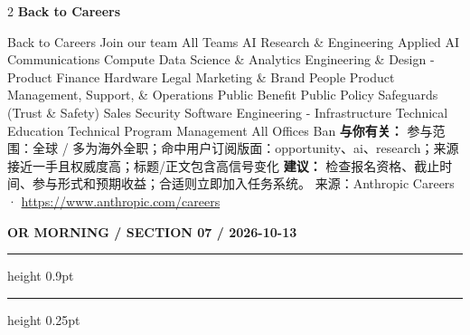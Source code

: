 \documentclass[10.5pt]{ctexart}
\begin{document}
\begin{multicols}{2}
\vspace{2mm}
{\large\bfseries Back to Careers}\par
Back to Careers Join our team All Teams AI Research \& Engineering Applied AI Communications Compute Data Science \& Analytics Engineering \& Design - Product Finance Hardware Legal Marketing \& Brand People Product Management, Support, \& Operations Public Benefit Public Policy Safeguards (Trust \& Safety) Sales Security Software Engineering - Infrastructure Technical Education Technical Program Management All Offices Ban
\textbf{与你有关：} 参与范围：全球 / 多为海外全职；命中用户订阅版面：opportunity、ai、research；来源接近一手且权威度高；标题/正文包含高信号变化
\textbf{建议：} 检查报名资格、截止时间、参与形式和预期收益；合适则立即加入任务系统。
{\footnotesize\color{ormuted} 来源：Anthropic Careers · \url{https://www.anthropic.com/careers}}
\end{multicols}
\newpage
{\small\bfseries OR MORNING / SECTION 07 / 2026-10-13}
\vspace{2mm}
\hrule height 0.9pt
\vspace{1.5mm}
\hrule height 0.25pt
\vspace{4mm}
\end{document}
